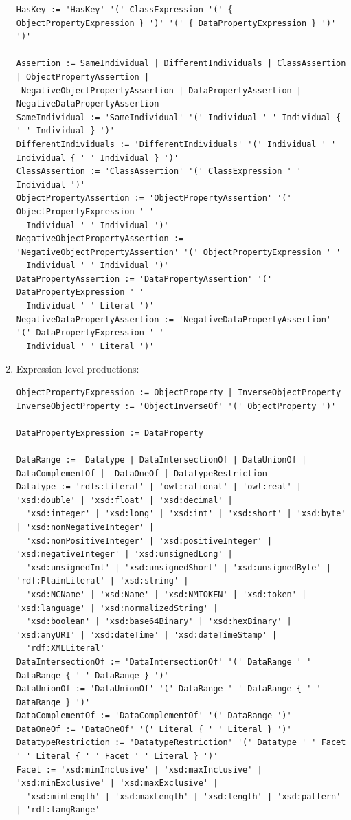 \documentclass[a4paper]{article}
\newcounter{ex}
\begin{document}
\begin{enumerate}
{\begin{verbatim}
HasKey := 'HasKey' '(' ClassExpression '(' { ObjectPropertyExpression } ')' '(' { DataPropertyExpression } ')' ')'

Assertion := SameIndividual | DifferentIndividuals | ClassAssertion | ObjectPropertyAssertion |
 NegativeObjectPropertyAssertion | DataPropertyAssertion | NegativeDataPropertyAssertion
SameIndividual := 'SameIndividual' '(' Individual ' ' Individual { ' ' Individual } ')'
DifferentIndividuals := 'DifferentIndividuals' '(' Individual ' ' Individual { ' ' Individual } ')'
ClassAssertion := 'ClassAssertion' '(' ClassExpression ' ' Individual ')'
ObjectPropertyAssertion := 'ObjectPropertyAssertion' '(' ObjectPropertyExpression ' '
  Individual ' ' Individual ')'
NegativeObjectPropertyAssertion := 'NegativeObjectPropertyAssertion' '(' ObjectPropertyExpression ' '
  Individual ' ' Individual ')'
DataPropertyAssertion := 'DataPropertyAssertion' '(' DataPropertyExpression ' '
  Individual ' ' Literal ')'
NegativeDataPropertyAssertion := 'NegativeDataPropertyAssertion' '(' DataPropertyExpression ' '
  Individual ' ' Literal ')'
\end{verbatim}
}
\item Expression-level productions:
{\scriptsize
\begin{verbatim}
ObjectPropertyExpression := ObjectProperty | InverseObjectProperty
InverseObjectProperty := 'ObjectInverseOf' '(' ObjectProperty ')'

DataPropertyExpression := DataProperty

DataRange :=  Datatype | DataIntersectionOf | DataUnionOf | DataComplementOf |  DataOneOf | DatatypeRestriction
Datatype := 'rdfs:Literal' | 'owl:rational' | 'owl:real' | 'xsd:double' | 'xsd:float' | 'xsd:decimal' |
  'xsd:integer' | 'xsd:long' | 'xsd:int' | 'xsd:short' | 'xsd:byte' | 'xsd:nonNegativeInteger' |
  'xsd:nonPositiveInteger' | 'xsd:positiveInteger' | 'xsd:negativeInteger' | 'xsd:unsignedLong' |
  'xsd:unsignedInt' | 'xsd:unsignedShort' | 'xsd:unsignedByte' | 'rdf:PlainLiteral' | 'xsd:string' |
  'xsd:NCName' | 'xsd:Name' | 'xsd:NMTOKEN' | 'xsd:token' | 'xsd:language' | 'xsd:normalizedString' |
  'xsd:boolean' | 'xsd:base64Binary' | 'xsd:hexBinary' | 'xsd:anyURI' | 'xsd:dateTime' | 'xsd:dateTimeStamp' |
  'rdf:XMLLiteral'
DataIntersectionOf := 'DataIntersectionOf' '(' DataRange ' ' DataRange { ' ' DataRange } ')'
DataUnionOf := 'DataUnionOf' '(' DataRange ' ' DataRange { ' ' DataRange } ')'
DataComplementOf := 'DataComplementOf' '(' DataRange ')'
DataOneOf := 'DataOneOf' '(' Literal { ' ' Literal } ')'
DatatypeRestriction := 'DatatypeRestriction' '(' Datatype ' ' Facet ' ' Literal { ' ' Facet ' ' Literal } ')'
Facet := 'xsd:minInclusive' | 'xsd:maxInclusive' | 'xsd:minExclusive' | 'xsd:maxExclusive' |
  'xsd:minLength' | 'xsd:maxLength' | 'xsd:length' | 'xsd:pattern' | 'rdf:langRange'


\end{verbatim}}
\end{enumerate}
\end{document}
